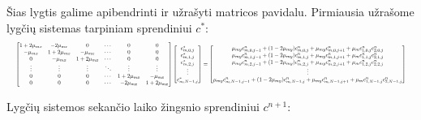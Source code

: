 Šias lygtis galime apibendrinti ir užrašyti matricos pavidalu. Pirmiausia užrašome lygčių sistemas tarpiniam sprendiniui $c^*$:
\begin{align} \label{eqs:adi-system-half}
  \resizebox{\textwidth}{!}{$
  \begin{bmatrix}
    1 + 2\mu_{mx} & -2\mu_{mx} & 0 & \cdots & 0 & 0\\
    -\mu_{mx} & 1 + 2\mu_{mx} & -\mu_{mx} & \cdots & 0 & 0\\
    0 & -\mu_{mx} & 1 + 2\mu_{mx} & \cdots & 0 & 0\\
    \vdots & \vdots & \vdots & \ddots & \vdots & \vdots\\
    0 & 0 & 0 & \cdots & 1 + 2\mu_{mx} & -\mu_{mx}\\
    0 & 0 & 0 & \cdots & -2\mu_{mx} & 1 + 2\mu_{mx}
  \end{bmatrix}
  \begin{bmatrix}
    c^*_{m,0,j}\\
    c^*_{m,1,j}\\
    c^*_{m,2,j}\\
    \vdots\\
    c^*_{m,N-1,j}
  \end{bmatrix}
  =
  \begin{bmatrix}
    \mu_{my}c^n_{m,0,j-1}+(1-2\mu_{my})c^n_{m,0,j}+\mu_{my}c^n_{m,0,j+1}+\mu_m c^n_{1,0,j}c^n_{2,0,j}\\
    \mu_{my}c^n_{m,1,j-1}+(1-2\mu_{my})c^n_{m,1,j}+\mu_{my}c^n_{m,1,j+1}+\mu_m c^n_{1,1,j}c^n_{2,1,j}\\
    \mu_{my}c^n_{m,2,j-1}+(1-2\mu_{my})c^n_{m,2,j}+\mu_{my}c^n_{m,2,j+1}+\mu_m c^n_{1,2,j}c^n_{2,2,j}\\
    \vdots\\
    \mu_{my}c^n_{m,N-1,j-1}+(1-2\mu_{my})c^n_{m,N-1,j}+\mu_{my}c^n_{m,N-1,j+1}+\mu_m c^n_{1,N-1,j}c^n_{2,N-1,j}
  \end{bmatrix}
  $}
\end{align}

Lygčių sistemos sekančio laiko žingsnio sprendiniui $c^{n+1}$:

